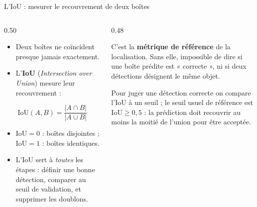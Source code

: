 \begin{frame}{L'IoU : mesurer le recouvrement de deux boîtes}
\begin{columns}[t]
\begin{column}{0.50\textwidth}
\begin{itemize}
  \item Deux boîtes ne coïncident presque jamais exactement.
  \item L'\textbf{IoU} (\emph{Intersection over Union}) mesure leur recouvrement :
\end{itemize}
\[
\mathrm{IoU}(A,B)=\frac{|A\cap B|}{|A\cup B|}
\]
\begin{itemize}
  \item $\mathrm{IoU}=0$ : boîtes disjointes ; $\mathrm{IoU}=1$ : boîtes identiques.
  \item L'IoU sert à \emph{toutes} les étapes : définir une bonne détection,
  comparer au seuil de validation, et supprimer les doublons.
\end{itemize}
\end{column}
\begin{column}{0.48\textwidth}
\begin{kbox}
C'est la \textbf{métrique de référence} de la localisation. Sans elle, impossible
de dire si une boîte prédite est « correcte », ni si deux détections désignent
le même objet.
\end{kbox}
\vspace{1mm}
\begin{ebox}
Pour juger une détection correcte on compare l'IoU à un seuil ; le seuil usuel
de référence est $\mathrm{IoU} \ge 0{,}5$ : la prédiction doit recouvrir au moins
la moitié de l'union pour être acceptée.
\end{ebox}
\end{column}
\end{columns}
\end{frame}

